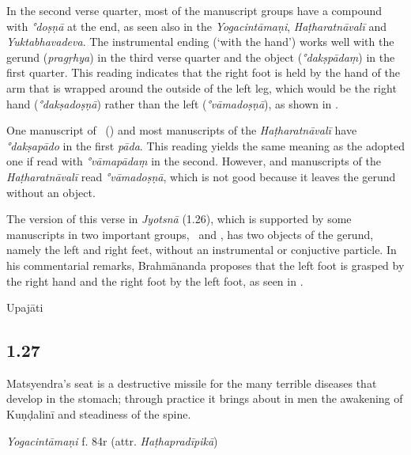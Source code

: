 \begin{ekdosis}
\begin{testimonia}[hp01_026]
\end{testimonia}

\begin{philcomm}[hp01_026]
In the second verse quarter, most of the manuscript groups have a compound with \emph{°doṣṇā} at the end, as seen also in the \emph{Yogacintāmaṇi}, \emph{Haṭharatnāvalī} and \emph{Yuktabhavadeva}. The instrumental ending (`with the hand') works well with the gerund (\emph{pragṛhya}) in the third verse quarter and the object (\emph{°dakṣpādaṃ}) in the first quarter. This reading indicates that the right foot is held by the hand of the arm that is wrapped around the outside of the left leg, which would be the right hand (\emph{°dakṣadoṣṇā}) rather than the left (\emph{°vāmadoṣṇā}), as shown in .

One manuscript of \textalpha\ () and most manuscripts of the \textit{Haṭharatnāvalī} have \emph{°dakṣapādo} in the first \emph{pāda}. This reading yields the same meaning as the adopted one if read with \emph{°vāmapādaṃ} in the second. However,  and manuscripts of the \textit{Haṭharatnāvalī} read \emph{°vāmadoṣṇā}, which is not good because it leaves the gerund without an object.

The version of this verse in \emph{Jyotsnā} (1.26), which is supported by some manuscripts in two important groups, \textbeta\ and \texteta, has two objects of the gerund, namely the left and right feet, without an instrumental or conjuctive particle. In his commentarial remarks, Brahmānanda proposes that the left foot is grasped by the right hand and the right foot by the left foot, as seen in .
\end{philcomm}

\begin{metre}[hp01_026]
Upajāti
\end{metre}

\subsection*{1.27}
\begin{translation}[hp01_027]
Matsyendra's seat is a destructive missile for the many terrible diseases that develop in the stomach; through practice it brings about in men the awakening of Kuṇḍalinī and steadiness of the spine.
\end{translation}

\begin{testimonia}[hp01_027]
\emph{Yogacintāmaṇi} f. 84r (attr. \emph{Haṭhapradīpikā})


\end{testimonia}
\end{ekdosis}

